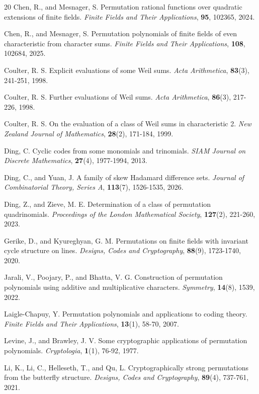 \documentclass[12pt]{amsart}
\theoremstyle{definition}
\theoremstyle{remark}
\numberwithin{equation}{section}
\begin{document}
\begin{thebibliography}{20}
Chen, R., and Mesnager, S. Permutation rational functions over quadratic extensions of finite fields. {\em Finite Fields and Their Applications}, \textbf{95}, 102365, 2024.

Chen, R., and Mesnager, S. Permutation polynomials of finite fields of even characteristic from character sums. {\em Finite Fields and Their Applications}, \textbf{108}, 102684, 2025.

Coulter, R. S. Explicit evaluations of some Weil sums. {\em Acta Arithmetica}, \textbf{83}(3), 241-251, 1998.

Coulter, R. S. Further evaluations of Weil sums. {\em Acta Arithmetica}, \textbf{86}(3), 217-226, 1998.

Coulter, R. S. On the evaluation of a class of Weil sums in characteristic 2. {\em New Zealand Journal of Mathematics}, \textbf{28}(2), 171-184, 1999.

Ding, C. Cyclic codes from some monomials and trinomials. {\em SIAM Journal on Discrete Mathematics}, \textbf{27}(4), 1977-1994, 2013.

Ding, C., and Yuan, J. A family of skew Hadamard difference sets. {\em Journal of Combinatorial Theory, Series A}, \textbf{113}(7), 1526-1535, 2026.



Ding, Z., and Zieve, M. E. Determination of a class of permutation quadrinomials. {\em Proceedings of the London Mathematical Society}, \textbf{127}(2), 221-260, 2023.

Gerike, D., and Kyureghyan, G. M. Permutations on finite fields with invariant cycle structure on lines. {\em Designs, Codes and Cryptography}, \textbf{88}(9), 1723-1740, 2020.

Jarali, V., Poojary, P., and Bhatta, V. G. Construction of permutation polynomials using additive and multiplicative characters. {\em Symmetry}, \textbf{14}(8), 1539, 2022.

Laigle-Chapuy, Y. Permutation polynomials and applications to coding theory. {\em Finite Fields and Their Applications}, \textbf{13}(1), 58-70, 2007.

Levine, J., and Brawley, J. V. Some cryptographic applications of permutation polynomials. {\em Cryptologia}, \textbf{1}(1), 76-92, 1977.

Li, K., Li, C., Helleseth, T., and Qu, L. Cryptographically strong permutations from the butterfly structure. {\em Designs, Codes and Cryptography}, \textbf{89}(4), 737-761, 2021.


\end{thebibliography}
\end{document}
